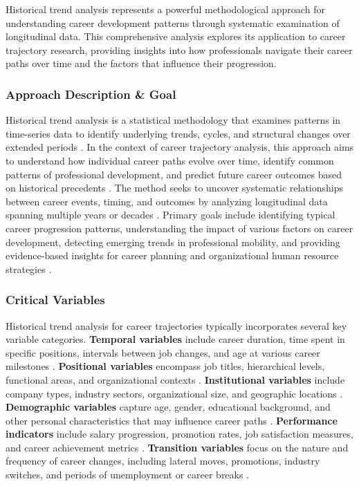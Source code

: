 \documentclass[../main.tex]{subfiles}
\begin{document}
Historical trend analysis represents a powerful methodological approach for understanding career development patterns through systematic examination of longitudinal data. This comprehensive analysis explores its application to career trajectory research, providing insights into how professionals navigate their career paths over time and the factors that influence their progression.

\subsubsection{Approach Description \& Goal}

Historical trend analysis is a statistical methodology that examines patterns in time-series data to identify underlying trends, cycles, and structural changes over extended periods \parencite{investopedia2023,netsuite2023}. In the context of career trajectory analysis, this approach aims to understand how individual career paths evolve over time, identify common patterns of professional development, and predict future career outcomes based on historical precedents \parencite{shermon2011}. The method seeks to uncover systematic relationships between career events, timing, and outcomes by analyzing longitudinal data spanning multiple years or decades \parencite{shamrck2023}. Primary goals include identifying typical career progression patterns, understanding the impact of various factors on career development, detecting emerging trends in professional mobility, and providing evidence-based insights for career planning and organizational human resource strategies \parencite{nature2023}.

\subsubsection{Critical Variables}

Historical trend analysis for career trajectories typically incorporates several key variable categories. \textbf{Temporal variables} include career duration, time spent in specific positions, intervals between job changes, and age at various career milestones \parencite{wang2021,haas2006}. \textbf{Positional variables} encompass job titles, hierarchical levels, functional areas, and organizational contexts \parencite{nature2023,pmc2020}. \textbf{Institutional variables} include company types, industry sectors, organizational size, and geographic locations \parencite{pmc2020}. \textbf{Demographic variables} capture age, gender, educational background, and other personal characteristics that may influence career paths \parencite{haas2006,nature2023}. \textbf{Performance indicators} include salary progression, promotion rates, job satisfaction measures, and career achievement metrics \parencite{carnegie2018}. \textbf{Transition variables} focus on the nature and frequency of career changes, including lateral moves, promotions, industry switches, and periods of unemployment or career breaks \parencite{pmc2020,carnegie2018}.
\end{document}
